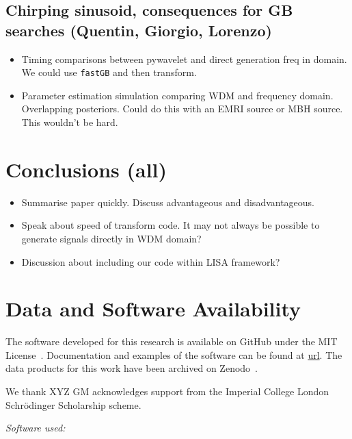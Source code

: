 \documentclass[%
 reprint,
superscriptaddress,
nofootinbib,
 amsmath,amssymb,
 aps,
colorlinks = true, 
linkcolor = blue, 
urlcolor = blue, 
citecolor = blue, 
anchorcolor = blue,
]{revtex4-2}
\begin{document}
\subsection{Chirping sinusoid, consequences for GB searches (Quentin, Giorgio, Lorenzo)}
\begin{itemize}
\item Timing comparisons between pywavelet and direct generation freq in domain. We could use \texttt{fastGB} and then transform. 
\item Parameter estimation simulation comparing WDM and frequency domain. Overlapping posteriors. Could do this with an EMRI source or MBH source. This wouldn't be hard. 
\end{itemize}
\section{Conclusions (all)}
\begin{itemize}
\item Summarise paper quickly. Discuss advantageous and disadvantageous. 
\item Speak about speed of transform code. It may not always be possible to generate signals directly in WDM domain? 
\item Discussion about including our code within LISA framework?
\end{itemize}




\section*{Data and Software Availability}
The software developed for this research is available on GitHub under the MIT License~\citep{}.
Documentation and examples of the software can be found at \url{url}. 
The data products for this work have been archived on Zenodo~\cite{X}.





\begin{acknowledgments}
We thank XYZ
GM acknowledges support from the Imperial College London Schr\"odinger Scholarship scheme.
\end{acknowledgments}


\vspace{4mm}
\noindent\textit{Software used:}
\newcommand{\python}{~\cite{python2020}}
\newcommand{\tensorflowProb}{~\cite{tensorflow, tensorflowProb}}
\newcommand{\numpy}{~\cite{numpy}}
\newcommand{\scipy}{~\cite{scipy}}
\newcommand{\pandas}{~\cite{pandas}}
\newcommand{\matplotlib}{~\cite{matplotlib}}
\newcommand{\jupyterbook}{~\cite{jupyterbook}}
\end{document}
